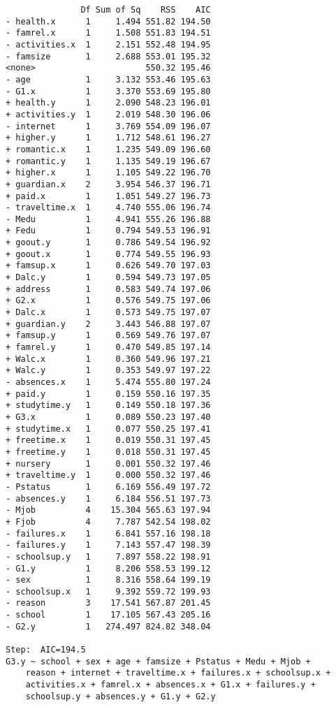 \documentclass[11pt]{article}
\begin{document}
\begin{enumerate}
\begin{verbatim}
               Df Sum of Sq    RSS    AIC
- health.x      1     1.494 551.82 194.50
- famrel.x      1     1.508 551.83 194.51
- activities.x  1     2.151 552.48 194.95
- famsize       1     2.688 553.01 195.32
<none>                      550.32 195.46
- age           1     3.132 553.46 195.63
- G1.x          1     3.370 553.69 195.80
+ health.y      1     2.090 548.23 196.01
+ activities.y  1     2.019 548.30 196.06
- internet      1     3.769 554.09 196.07
+ higher.y      1     1.712 548.61 196.27
+ romantic.x    1     1.235 549.09 196.60
+ romantic.y    1     1.135 549.19 196.67
+ higher.x      1     1.105 549.22 196.70
+ guardian.x    2     3.954 546.37 196.71
+ paid.x        1     1.051 549.27 196.73
- traveltime.x  1     4.740 555.06 196.74
- Medu          1     4.941 555.26 196.88
+ Fedu          1     0.794 549.53 196.91
+ goout.y       1     0.786 549.54 196.92
+ goout.x       1     0.774 549.55 196.93
+ famsup.x      1     0.626 549.70 197.03
+ Dalc.y        1     0.594 549.73 197.05
+ address       1     0.583 549.74 197.06
+ G2.x          1     0.576 549.75 197.06
+ Dalc.x        1     0.573 549.75 197.07
+ guardian.y    2     3.443 546.88 197.07
+ famsup.y      1     0.569 549.76 197.07
+ famrel.y      1     0.470 549.85 197.14
+ Walc.x        1     0.360 549.96 197.21
+ Walc.y        1     0.353 549.97 197.22
- absences.x    1     5.474 555.80 197.24
+ paid.y        1     0.159 550.16 197.35
+ studytime.y   1     0.149 550.18 197.36
+ G3.x          1     0.089 550.23 197.40
+ studytime.x   1     0.077 550.25 197.41
+ freetime.x    1     0.019 550.31 197.45
+ freetime.y    1     0.018 550.31 197.45
+ nursery       1     0.001 550.32 197.46
+ traveltime.y  1     0.000 550.32 197.46
- Pstatus       1     6.169 556.49 197.72
- absences.y    1     6.184 556.51 197.73
- Mjob          4    15.304 565.63 197.94
+ Fjob          4     7.787 542.54 198.02
- failures.x    1     6.841 557.16 198.18
- failures.y    1     7.143 557.47 198.39
- schoolsup.y   1     7.897 558.22 198.91
- G1.y          1     8.206 558.53 199.12
- sex           1     8.316 558.64 199.19
- schoolsup.x   1     9.392 559.72 199.93
- reason        3    17.541 567.87 201.45
- school        1    17.105 567.43 205.16
- G2.y          1   274.497 824.82 348.04

Step:  AIC=194.5
G3.y ~ school + sex + age + famsize + Pstatus + Medu + Mjob + 
    reason + internet + traveltime.x + failures.x + schoolsup.x + 
    activities.x + famrel.x + absences.x + G1.x + failures.y + 
    schoolsup.y + absences.y + G1.y + G2.y


\end{verbatim}
\end{enumerate}
\end{document}
